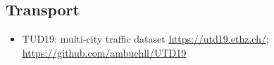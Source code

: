 \documentclass[10pt]{article} %
\begin{document}
    \subsection{Transport}
        \begin{itemize}
            \item TUD19: multi-city traffic dataset \url{https://utd19.ethz.ch/}; \url{https://github.com/ambuehll/UTD19}
        \end{itemize}


\newpage

\footnotesize


\end{document}
